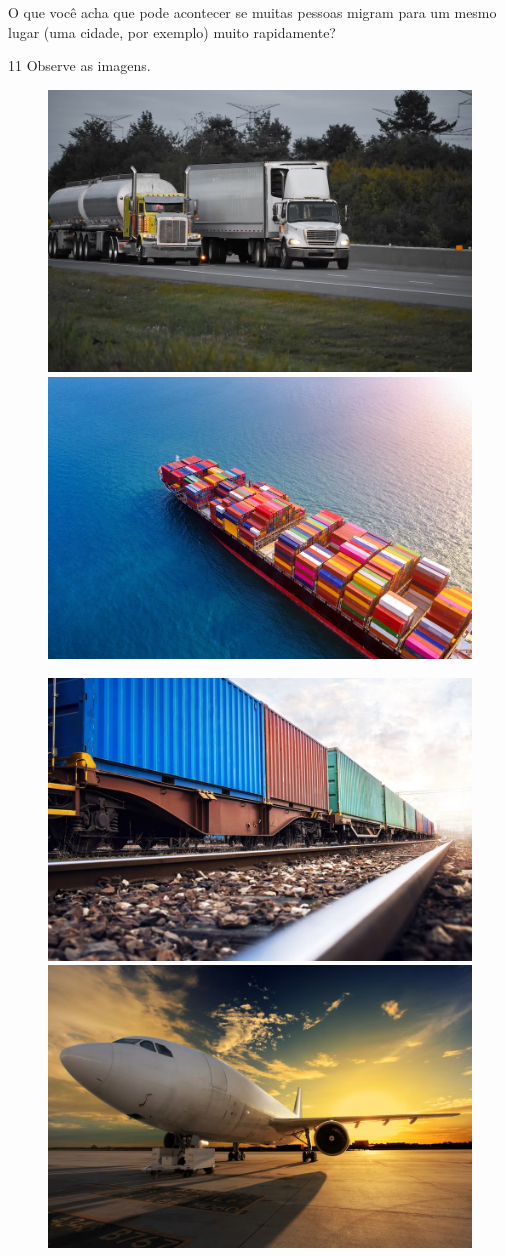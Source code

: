 \begin{itemize}
\begin{itemize}
\begin{itemize}
\begin{itemize}
{{\begin{itemize}
\begin{itemize}
O que você acha que pode acontecer se muitas pessoas migram para um mesmo lugar (uma cidade, por exemplo) muito rapidamente?


\num{11} Observe as imagens.

\begin{figure}[htpb!]
\includegraphics[width=.5\textwidth]{./imgs/img60.png}
\includegraphics[width=.5\textwidth]{./imgs/img61.png}
\end{figure}


\begin{figure}[htpb!]
\includegraphics[width=.5\textwidth]{./imgs/img62.png}
\includegraphics[width=.5\textwidth]{./imgs/img63.png}
\end{figure}


\end{itemize}
\end{itemize}}}
\end{itemize}
\end{itemize}
\end{itemize}
\end{itemize}
